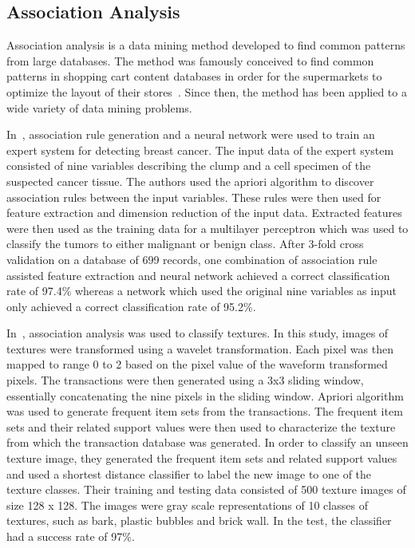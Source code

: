     


\subsection{Association Analysis}

Association analysis is a data mining method developed to find common patterns from large databases. The method was famously conceived to find common patterns in shopping cart content databases in order for the supermarkets to optimize the layout of their stores~\cite{Agrawal:1993:MAR:170036.170072}. Since then, the method has been applied to a wide variety of data mining problems.

In~\cite{KARABATAK20093465}, association rule generation and a neural network were used to train an expert system for detecting breast cancer. The input data of the expert system consisted of nine variables describing the clump and a cell specimen of the suspected cancer tissue. The authors used the apriori algorithm to discover association rules between the input variables. These rules were then used for feature extraction and dimension reduction of the input data. Extracted features were then used as the training data for a multilayer perceptron which was used to classify the tumors to either malignant or benign class. After 3-fold cross validation on a database of 699 records, one combination of association rule assisted feature extraction and neural network achieved a correct classification rate of 97.4\% whereas a network which used the original nine variables as input only achieved a correct classification rate of 95.2\%.

In~\cite{KARABATAK201132}, association analysis was used to classify textures. In this study, images of textures were transformed using a wavelet transformation. Each pixel was then mapped to range 0 to 2 based on the pixel value of the waveform transformed pixels. The transactions were then generated using a 3x3 sliding window, essentially concatenating the nine pixels in the sliding window. Apriori algorithm was used to generate frequent item sets from the transactions. The frequent item sets and their related support values were then used to characterize the texture from which the transaction database was generated. In order to classify an unseen texture image, they generated the frequent item sets and related support values and used a shortest distance classifier to label the new image to one of the texture classes. Their training and testing data consisted of 500 texture images of size 128 x 128. The images were gray scale representations of 10 classes of textures, such as bark, plastic bubbles and brick wall. In the test, the classifier had a success rate of 97\%. 